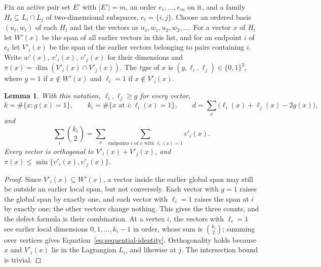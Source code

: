 \documentclass[11pt]{article}
\newtheorem{lemma}{Lemma}
\begin{document}
Fix an active pair set $E'$ with $|E'|=m$, an order $e_1,\dots,e_m$ on it,
and a family $H_t\subseteq L_i\cap L_j$ of two-dimensional subspaces,
$e_t=\{i,j\}$. Choose an ordered basis $(u_t,w_t)$ of each $H_t$ and list
the vectors as $u_1,w_1,u_2,w_2,\dots$. For a vector $x$ of $H_t$ let
$W'(x)$ be the span of all earlier vectors in this list, and for an endpoint
$i$ of $e_t$ let $V'_i(x)$ be the span of the earlier vectors belonging to
pairs containing $i$. Write $w'(x)$, $v'_i(x)$, $v'_j(x)$ for their
dimensions and $\pi(x)=\dim(V'_i(x)\cap V'_j(x))$. The \emph{type} of $x$ is
$(g,\ell_i,\ell_j)\in\{0,1\}^3$, where $g=1$ if $x\notin W'(x)$ and
$\ell_i=1$ if $x\notin V'_i(x)$.

\begin{lemma}\label{lem:sequential-accounting}
With this notation, $\ell_i,\ell_j\ge g$ for every vector,
\[
 k=\#\{x:g(x)=1\},\qquad k_i=\#\{x\text{ at }i:\ell_i(x)=1\},\qquad
 d=\sum_x\bigl(\ell_i(x)+\ell_j(x)-2g(x)\bigr),
\]
and
\begin{equation}\label{eq:sequential-identity}
 \sum_i\binom{k_i}{2}=\sum_x\sum_{\text{endpoints }i\text{ of }x\text{ with }\ell_i(x)=1}v'_i(x).
\end{equation}
Every vector is orthogonal to $V'_i(x)+V'_j(x)$, and
$\pi(x)\le\min\{v'_i(x),v'_j(x)\}$.
\end{lemma}
\begin{proof}
Since $V'_i(x)\subseteq W'(x)$, a vector inside the earlier global span may
still be outside an earlier local span, but not conversely. Each vector
with $g=1$ raises the global span by exactly one, and each vector with
$\ell_i=1$ raises the span at $i$ by exactly one; the other vectors change
nothing. This gives the three counts, and the defect formula is their
combination. At a vertex $i$, the vectors with $\ell_i=1$ see earlier local
dimensions $0,1,\dots,k_i-1$ in order, whose sum is $\binom{k_i}{2}$;
summing over vertices gives Equation~\eqref{eq:sequential-identity}.
Orthogonality holds because $x$ and $V'_i(x)$ lie in the Lagrangian
$L_i$, and likewise at $j$. The intersection bound is trivial.
\end{proof}
\end{document}
